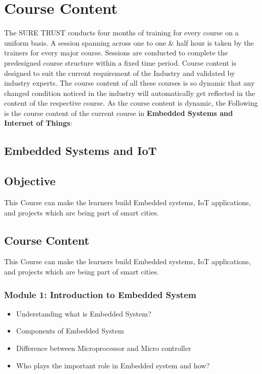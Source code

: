 \documentclass[12pt]{article}
\begin{document}
\section*{Course Content}
The SURE TRUST conducts four months of training for every course on a uniform basis. A session
spanning across one to one \& half hour is taken by the trainers for every major course. Sessions
are conducted to complete the predesigned course structure within a fixed time period. Course
content is designed to suit the current requirement of the Industry and validated by industry
experts. The course content of all these courses is so dynamic that any changed condition
noticed in the industry will automatically get reflected in the content of the respective course.
As the course content is dynamic, the Following is the course content of the current course in
\textbf{Embedded Systems and Internet of Things}:

\pagebreak

\begin{center}
\section*{Embedded Systems and IoT} 
\end{center}

 \subsection*{Objective}
This Course can make the learners build Embedded systems, IoT applications, and
projects which are being part of smart cities.

 \subsection*{Course Content}
This Course can make the learners build Embedded systems, IoT applications, and
projects which are being part of smart cities.

\subsubsection*{Module 1: Introduction to Embedded System}
\begin{itemize}
  \item Understanding what is Embedded System?
  \item Components of Embedded System
  \item Difference between Microprocessor and Micro controller
   \item Who plays the important role in Embedded system and how?
\end{itemize}
\end{document}
